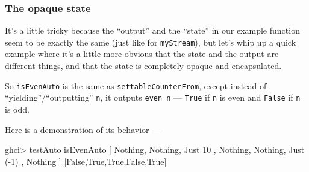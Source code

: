 \documentclass[]{article}
\newenvironment{Shaded}{}{}
\newcommand{\CommentTok}[1]{\textcolor[rgb]{0.38,0.63,0.69}{\textit{#1}}}
\newcommand{\DataTypeTok}[1]{\textcolor[rgb]{0.56,0.13,0.00}{#1}}
\newcommand{\DecValTok}[1]{\textcolor[rgb]{0.25,0.63,0.44}{#1}}
\newcommand{\FunctionTok}[1]{\textcolor[rgb]{0.02,0.16,0.49}{#1}}
\newcommand{\KeywordTok}[1]{\textcolor[rgb]{0.00,0.44,0.13}{\textbf{#1}}}
\newcommand{\NormalTok}[1]{#1}
\newcommand{\OperatorTok}[1]{\textcolor[rgb]{0.40,0.40,0.40}{#1}}
\newcommand{\OtherTok}[1]{\textcolor[rgb]{0.00,0.44,0.13}{#1}}
\begin{document}
\subsubsection{The opaque state}\label{the-opaque-state}

It's a little tricky because the ``output'' and the ``state'' in our example
function seem to be exactly the same (just like for \texttt{myStream}), but
let's whip up a quick example where it's a little more obvious that the state
and the output are different things, and that the state is completely opaque and
encapsulated.

\begin{Shaded}
\end{Shaded}

So \texttt{isEvenAuto} is the same as \texttt{settableCounterFrom}, except
instead of ``yielding''/``outputting'' \texttt{n}, it outputs \texttt{even\ n}
--- \texttt{True} if \texttt{n} is even and \texttt{False} if \texttt{n} is odd.

Here is a demonstration of its behavior ---

\begin{Shaded}
\begin{Highlighting}[]
\NormalTok{ghci}\OperatorTok{\textgreater{}}\NormalTok{ testAuto isEvenAuto  [ }\DataTypeTok{Nothing}\NormalTok{, }\DataTypeTok{Nothing}\NormalTok{, }\DataTypeTok{Just} \DecValTok{10}
\NormalTok{                           , }\DataTypeTok{Nothing}\NormalTok{, }\DataTypeTok{Nothing}\NormalTok{, }\DataTypeTok{Just}\NormalTok{ (}\OperatorTok{{-}}\DecValTok{1}\NormalTok{)}
\NormalTok{                           , }\DataTypeTok{Nothing}\NormalTok{ ]}
\NormalTok{[}\DataTypeTok{False}\NormalTok{,}\DataTypeTok{True}\NormalTok{,}\DataTypeTok{True}\NormalTok{,}\DataTypeTok{False}\NormalTok{,}\DataTypeTok{True}\NormalTok{]}
\end{Highlighting}
\end{Shaded}
\end{document}
